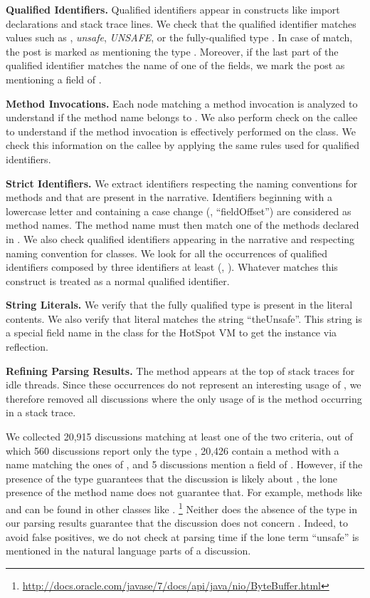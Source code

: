 \textbf{Qualified Identifiers.}
Qualified identifiers appear in constructs like import declarations and stack trace lines.
We check that the qualified identifier matches values such as
\unsafe{}, \emph{unsafe}, \emph{UNSAFE}, or the fully-qualified type \smu{}.
In case of match, the post is marked as mentioning the type \unsafe{}.
Moreover, if the last part of the qualified identifier matches the name of one of the \smu{} fields,
we mark the post as mentioning a field of \unsafe{}.

\textbf{Method Invocations.}
Each node matching a method invocation is analyzed to understand if the method name belongs to \smu{}.
We also perform check on the callee to understand if the method invocation is effectively performed on the \unsafe{} class.
We check this information on the callee by applying the same rules used for qualified identifiers.

\textbf{Strict Identifiers.}
We extract identifiers respecting the \java{} naming conventions for methods and that are present in the narrative.
Identifiers beginning with a lowercase letter and containing a case change
(\eg{}, ``fieldOffset'') are considered as method names.
The method name must then match one of the methods declared in \unsafe{}.
We also check qualified identifiers appearing in the narrative and respecting naming convention for classes.
We look for all the occurrences of qualified identifiers composed by three identifiers at least (\eg{}, \smu{}).
Whatever matches this construct is treated as a normal qualified identifier.

\textbf{String Literals.}
We verify that the fully qualified type \smu{} is present in the literal contents.
We also verify that literal matches the string ``theUnsafe''.
This string is a special field name in the \unsafe{} class for the HotSpot VM to get the instance via reflection.

\textbf{Refining Parsing Results.}
The  method appears at the top of stack traces for idle threads.
Since these occurrences do not represent an interesting usage of \unsafe{},
we therefore removed all discussions where the only usage of \unsafe{} is the  method occurring in a stack trace.

We collected 20,915 discussions matching at least one of the two criteria,
out of which 560 discussions report only the type \unsafe{},
20,426 contain a method with a name matching the ones of \unsafe{},
and 5 discussions mention a field of \unsafe{}.
However, if the presence of the type \unsafe{} guarantees that the discussion is likely about \smu{},
the lone presence of the method name does not guarantee that.
For example, methods like  and  can be found in other classes like .%
\footnote{\url{http://docs.oracle.com/javase/7/docs/api/java/nio/ByteBuffer.html}}
Neither does the absence of the type in our parsing results guarantee that the discussion does not concern \smu{}.
Indeed, to avoid false positives,
we do not check at parsing time if the lone term ``unsafe'' is mentioned in the natural language parts of a discussion.

